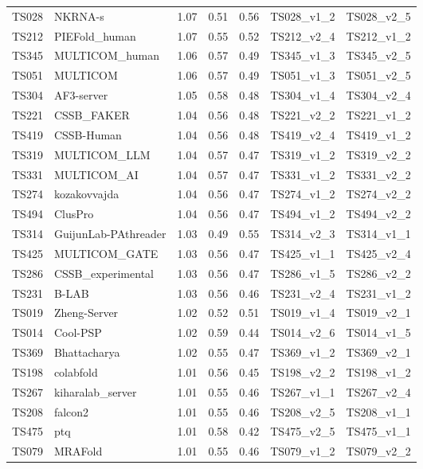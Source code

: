 \begin{table}[ht]
{\begin{tabular}{llrrrll}
TS028 & NKRNA-s & 1.07 & 0.51 & 0.56 & TS028\_v1\_2 & TS028\_v2\_5 \\ 
TS212 & PIEFold\_human & 1.07 & 0.55 & 0.52 & TS212\_v2\_4 & TS212\_v1\_2 \\ 
TS345 & MULTICOM\_human & 1.06 & 0.57 & 0.49 & TS345\_v1\_3 & TS345\_v2\_5 \\ 
TS051 & MULTICOM & 1.06 & 0.57 & 0.49 & TS051\_v1\_3 & TS051\_v2\_5 \\ 
TS304 & AF3-server & 1.05 & 0.58 & 0.48 & TS304\_v1\_4 & TS304\_v2\_4 \\ 
TS221 & CSSB\_FAKER & 1.04 & 0.56 & 0.48 & TS221\_v2\_2 & TS221\_v1\_2 \\ 
TS419 & CSSB-Human & 1.04 & 0.56 & 0.48 & TS419\_v2\_4 & TS419\_v1\_2 \\ 
TS319 & MULTICOM\_LLM & 1.04 & 0.57 & 0.47 & TS319\_v1\_2 & TS319\_v2\_2 \\ 
TS331 & MULTICOM\_AI & 1.04 & 0.57 & 0.47 & TS331\_v1\_2 & TS331\_v2\_2 \\ 
TS274 & kozakovvajda & 1.04 & 0.56 & 0.47 & TS274\_v1\_2 & TS274\_v2\_2 \\ 
TS494 & ClusPro & 1.04 & 0.56 & 0.47 & TS494\_v1\_2 & TS494\_v2\_2 \\ 
TS314 & GuijunLab-PAthreader & 1.03 & 0.49 & 0.55 & TS314\_v2\_3 & TS314\_v1\_1 \\ 
TS425 & MULTICOM\_GATE & 1.03 & 0.56 & 0.47 & TS425\_v1\_1 & TS425\_v2\_4 \\ 
TS286 & CSSB\_experimental & 1.03 & 0.56 & 0.47 & TS286\_v1\_5 & TS286\_v2\_2 \\ 
TS231 & B-LAB & 1.03 & 0.56 & 0.46 & TS231\_v2\_4 & TS231\_v1\_2 \\ 
TS019 & Zheng-Server & 1.02 & 0.52 & 0.51 & TS019\_v1\_4 & TS019\_v2\_1 \\ 
TS014 & Cool-PSP & 1.02 & 0.59 & 0.44 & TS014\_v2\_6 & TS014\_v1\_5 \\ 
TS369 & Bhattacharya & 1.02 & 0.55 & 0.47 & TS369\_v1\_2 & TS369\_v2\_1 \\ 
TS198 & colabfold & 1.01 & 0.56 & 0.45 & TS198\_v2\_2 & TS198\_v1\_2 \\ 
TS267 & kiharalab\_server & 1.01 & 0.55 & 0.46 & TS267\_v1\_1 & TS267\_v2\_4 \\ 
TS208 & falcon2 & 1.01 & 0.55 & 0.46 & TS208\_v2\_5 & TS208\_v1\_1 \\ 
TS475 & ptq & 1.01 & 0.58 & 0.42 & TS475\_v2\_5 & TS475\_v1\_1 \\ 
TS079 & MRAFold & 1.01 & 0.55 & 0.46 & TS079\_v1\_2 & TS079\_v2\_2 \\ 

\end{tabular}}
\end{table}
